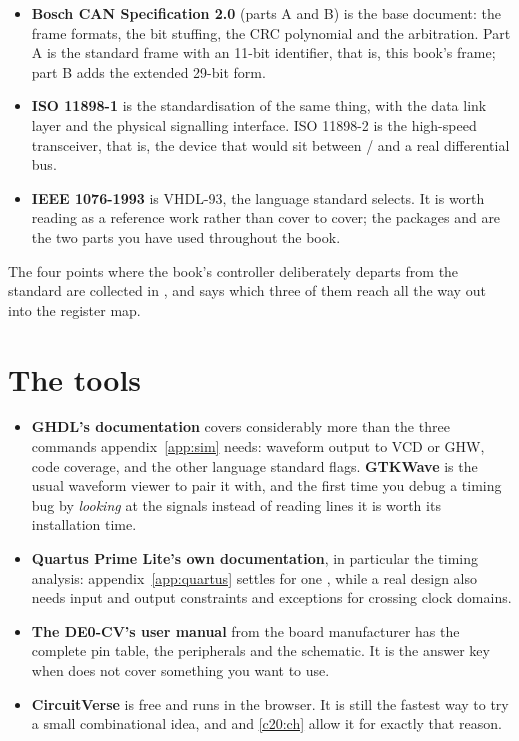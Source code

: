 \begin{itemize}
  \item \textbf{Bosch CAN Specification 2.0} (parts A and B) is the base document: the frame formats,
    the bit stuffing, the CRC polynomial and the arbitration. Part A is the standard frame with an
    11-bit identifier, that is, this book's frame; part B adds the extended 29-bit form.
  \item \textbf{ISO 11898-1} is the standardisation of the same thing, with the data link layer and
    the physical signalling interface. ISO 11898-2 is the high-speed transceiver, that is, the device
    that would sit between / and a real differential bus.
  \item \textbf{IEEE 1076-1993} is VHDL-93, the language standard  selects. It is worth
    reading as a reference work rather than cover to cover; the packages 
    and  are the two parts you have used throughout the book.
\end{itemize}

The four points where the book's controller deliberately departs from the standard are collected in
, and  says which three of them reach all the way out
into the register map.

\section{The tools}
\label{app:reading:tools}

\begin{itemize}
  \item \textbf{GHDL's documentation} covers considerably more than the three commands
    appendix~\ref{app:sim} needs: waveform output to VCD or GHW, code coverage, and the other
    language standard flags. \textbf{GTKWave} is the usual waveform viewer to pair it with, and the
    first time you debug a timing bug by \emph{looking} at the signals instead of reading
     lines it is worth its installation time.
  \item \textbf{Quartus Prime Lite's own documentation}, in particular the timing analysis:
    appendix~\ref{app:quartus} settles for one , while a real design also needs
    input and output constraints and exceptions for crossing clock domains.
  \item \textbf{The DE0-CV's user manual} from the board manufacturer has the complete pin table, the
    peripherals and the schematic. It is the answer key when  does not cover
    something you want to use.
  \item \textbf{CircuitVerse} is free and runs in the browser. It is still the fastest way to try a
    small combinational idea, and  and \ref{c20:ch} allow it for exactly that reason.
\end{itemize}

